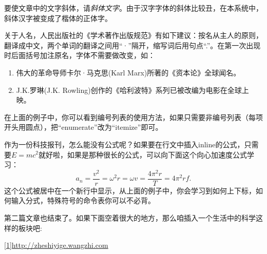 \begin{multicols}{3}
    
    要使文章中的文字斜体，请\textit{斜体文字}。由于汉字字体的斜体比较丑，在本系统中，斜体汉字被变成了楷体的正体字。
    
    关于人名，人民出版社的《学术著作出版规范》有如下建议：按名从主人的原则，翻译成中文，两个单词的翻译之间用“·”隔开，缩写词后用句点“.”。在第一次出现时后面括号加注原名，字体不需要做改变，如：
    
    \begin{enumerate}
        \item 伟大的革命导师卡尔·马克思(Karl Marx)所著的《资本论》全球闻名。
        \item J.K.罗琳(J.K. Rowling)创作的《哈利波特》系列已被改编为电影在全球上映。
    \end{enumerate}
    
    在上面的例子中，你可以看到编号列表的使用方法，如果只需要非编号列表（每项开头用圆点），把“enumerate”改为“itemize”即可。
    
    作为一份科技报刊，怎么能没有公式呢？如果要在行文中插入inline的公式，只需要$E=mc^2$就好啦，如果是那种很长的公式，可以向下面这个向心加速度公式学习：
    \[
    a_n=\frac{v^2}{r}=\omega^2 r=\omega v=\frac{4\pi^2 r}{T}=4\pi^2rf.
    \]
    这个公式被居中在一个新行中显示，从上面的例子中，你会学习到如何上下标，如何输入分式，特殊符号的命令表你可以不必背。
    
    第二篇文章也结束了。如果下面空着很大的地方，那么咱插入一个生活中的科学这样的板块吧:
\end{multicols}

\noindent{}

\noindent\url{[1]http://zheshiyige.wangzhi.com}

